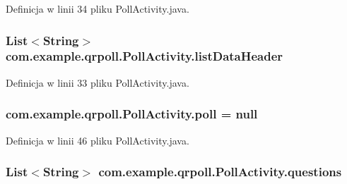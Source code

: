 Definicja w linii 34 pliku Poll\+Activity.\+java.

\hypertarget{classcom_1_1example_1_1qrpoll_1_1_poll_activity_a62dde3c117f038e463aa7174906f5f7b}{
\subsubsection[{list\+Data\+Header}]{\setlength{\rightskip}{0pt plus 5cm}List$<$String$>$ com.\+example.\+qrpoll.\+Poll\+Activity.\+list\+Data\+Header\hspace{0.3cm}{\ttfamily [package]}}}\label{classcom_1_1example_1_1qrpoll_1_1_poll_activity_a62dde3c117f038e463aa7174906f5f7b}


Definicja w linii 33 pliku Poll\+Activity.\+java.

\hypertarget{classcom_1_1example_1_1qrpoll_1_1_poll_activity_accbd807fe57852d64377c5a96401c376}{
\subsubsection[{poll}]{ com.\+example.\+qrpoll.\+Poll\+Activity.\+poll = null\hspace{0.3cm}{\ttfamily [private]}}}\label{classcom_1_1example_1_1qrpoll_1_1_poll_activity_accbd807fe57852d64377c5a96401c376}


Definicja w linii 46 pliku Poll\+Activity.\+java.

\hypertarget{classcom_1_1example_1_1qrpoll_1_1_poll_activity_ae9caea6dcd77802d9edc7f86ace0fc5c}{
\subsubsection[{questions}]{\setlength{\rightskip}{0pt plus 5cm}List$<$String$>$ com.\+example.\+qrpoll.\+Poll\+Activity.\+questions\hspace{0.3cm}{\ttfamily [private]}}}\label{classcom_1_1example_1_1qrpoll_1_1_poll_activity_ae9caea6dcd77802d9edc7f86ace0fc5c}


